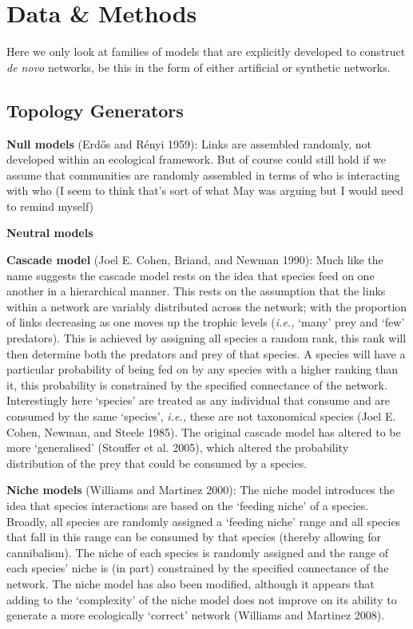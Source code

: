 \documentclass[
  letterpaper,
  DIV=11,
  numbers=noendperiod]{scrartcl}
\begin{document}
\section{Data \& Methods}\label{sec-data-methods}

Here we only look at families of models that are explicitly developed to
construct \emph{de novo} networks, be this in the form of either
artificial or synthetic networks.

\subsection{Topology Generators}\label{topology-generators}

\textbf{Null models} (Erdős and Rényi 1959): Links are assembled
randomly, not developed within an ecological framework. But of course
could still hold if we assume that communities are randomly assembled in
terms of who is interacting with who (I seem to think that's sort of
what May was arguing but I would need to remind myself)

\textbf{Neutral models}

\textbf{Cascade model} (Joel E. Cohen, Briand, and Newman 1990): Much
like the name suggests the cascade model rests on the idea that species
feed on one another in a hierarchical manner. This rests on the
assumption that the links within a network are variably distributed
across the network; with the proportion of links decreasing as one moves
up the trophic levels (\emph{i.e.,} `many' prey and `few' predators).
This is achieved by assigning all species a random rank, this rank will
then determine both the predators and prey of that species. A species
will have a particular probability of being fed on by any species with a
higher ranking than it, this probability is constrained by the specified
connectance of the network. Interestingly here `species' are treated as
any individual that consume and are consumed by the same `species',
\emph{i.e.,} these are not taxonomical species (Joel E. Cohen, Newman,
and Steele 1985). The original cascade model has altered to be more
`generalised' (Stouffer et al. 2005), which altered the probability
distribution of the prey that could be consumed by a species.

\textbf{Niche models} (Williams and Martinez 2000): The niche model
introduces the idea that species interactions are based on the `feeding
niche' of a species. Broadly, all species are randomly assigned a
`feeding niche' range and all species that fall in this range can be
consumed by that species (thereby allowing for cannibalism). The niche
of each species is randomly assigned and the range of each species'
niche is (in part) constrained by the specified connectance of the
network. The niche model has also been modified, although it appears
that adding to the `complexity' of the niche model does not improve on
its ability to generate a more ecologically `correct' network (Williams
and Martinez 2008).
\end{document}
